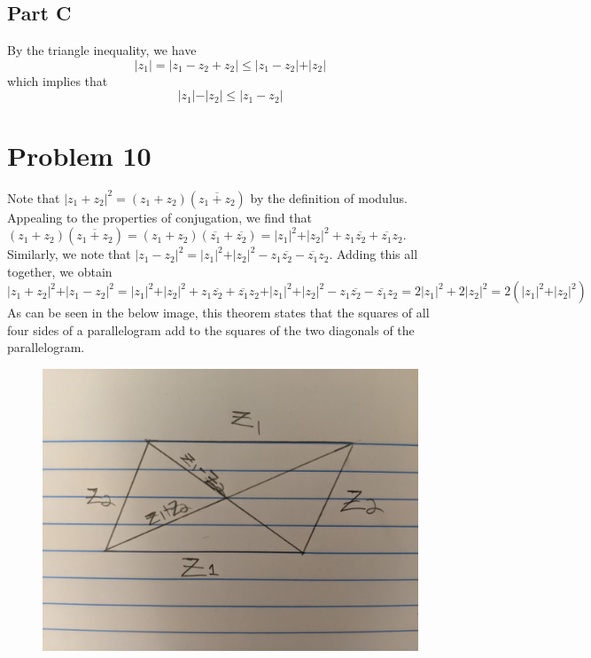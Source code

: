 \documentclass[12pt]{article}
\begin{document}
\subsection*{Part C}
By the triangle inequality, we have
\[
\vert z_1 \vert = \vert z_1 - z_2 + z_2 \vert \leq \vert z_1 - z_2 \vert + \vert z_2 \vert
\] which implies that
\[
\vert z_1 \vert - \vert z_2 \vert \leq \vert z_1 - z_2 \vert
\]
\newpage
\section*{Problem 10}
Note that $\vert z_1 + z_2 \vert^2  = (z_1+z_2)(\overline{z_1+z_2})$ by the definition of modulus. Appealing to the properties of conjugation, we find that
$(z_1+z_2)(\overline{z_1+z_2}) = (z_1+z_2)(\overline{z_1} + \overline{z_2}) =  \vert z_1 \vert^2 + \vert z_2 \vert ^2 + z_1\overline{z_2} + \overline{z_1}z_2$. Similarly, we note that $\vert z_1 - z_2\vert^2 = \vert z_1 \vert^2 + \vert z_2 \vert ^2  - z_1\overline{z_2} - \overline{z_1}z_2$. Adding this all together, we obtain
\[
\vert z_1 + z_2 \vert^2 + \vert z_1 - z_2\vert^2 =  \vert z_1 \vert^2 + \vert z_2 \vert ^2 + z_1\overline{z_2} + \overline{z_1}z_2 + \vert z_1 \vert^2 + \vert z_2 \vert ^2  - z_1\overline{z_2} - \overline{z_1}z_2 = 2 \vert z_1 \vert^2 + 2 \vert z_2 \vert^2 = 2(\vert z_1 \vert^2 + \vert z_2 \vert ^2)
\] As can be seen in the below image, this theorem states that the squares of all four sides of a parallelogram add to the squares of the two diagonals of the parallelogram.
\begin{figure}[H]
\centering
\includegraphics[width=\textwidth]{10}
\end{figure}
\newpage
\end{document}
